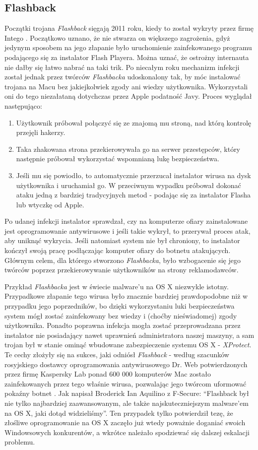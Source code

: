 \documentclass[polish]{kbk}
\begin{document}
\subsection{Flashback \cite{flashback}}
Początki trojana \textit{Flashback} sięgają 2011 roku, kiedy to został wykryty przez firmę Intego \cite{intego}. Początkowo uznano, że nie stwarza on większego zagrożenia, gdyż jedynym sposobem na jego złapanie było uruchomienie zainfekowanego programu podającego się za instalator Flash Playera. Można uznać, że ostrożny internauta nie dałby się łatwo nabrać na taki trik. Po niecałym roku mechanizm infekcji został jednak przez twórców \textit{Flashbacka} udoskonalony tak, by móc instalować trojana na Macu bez jakiejkolwiek zgody ani wiedzy użytkownika. Wykorzystali oni do tego niezałataną dotychczas przez Apple podatność Javy. Proces wyglądał następująco:
\begin{enumerate}
\item Użytkownik próbował połączyć się ze znajomą mu stroną, nad którą kontrolę przejęli hakerzy.
\item Taka zhakowana strona przekierowywała go na serwer przestępców, który następnie próbował wykorzystać wspomnianą lukę bezpieczeństwa.
\item Jeśli mu się powiodło, to automatycznie przerzucał instalator wirusa na dysk użytkownika i uruchamiał go. W przeciwnym wypadku próbował dokonać ataku jedną z bardziej tradycyjnych metod - podając się za instalator Flasha lub wtyczkę od Apple.
\end{enumerate}
Po udanej infekcji instalator sprawdzał, czy na komputerze ofiary zainstalowane jest oprogramowanie antywirusowe i jeśli takie wykrył, to przerywał proces atak, aby uniknąć wykrycia. Jeśli natomiast system nie był chroniony, to instalator kończył swoją pracę podłączając komputer ofiary do botnetu atakujących. Głównym celem, dla którego stworzono \textit{Flashbacka}, było wzbogacenie się jego twórców poprzez przekierowywanie użytkowników na strony reklamodawców.

Przykład \textit{Flashbacka} jest w świecie malware'u na OS X niezwykle istotny. Przypadkowe złapanie tego wirusa było znacznie bardziej prawdopodobne niż w przypadku jego poprzedników, bo dzięki wykorzystaniu luki bezpieczeństwa system mógł zostać zainfekowany bez wiedzy i (choćby nieświadomej) zgody użytkownika. Ponadto poprawna infekcja mogła zostać przeprowadzana przez instalator nie posiadający nawet uprawnień administratora naszej maszyny, a sam trojan był w stanie ominąć wbudowane zabezpieczenie systemu OS X - \textit{XProtect}. Te cechy złożyły się na sukces, jaki odniósł \textit{Flashback} - według szacunków rosyjskiego dostawcy oprogramowania antywirusowego Dr. Web potwierdzonych przez firmę Kaspersky Lab ponad 600 000 komputerów Mac zostało zainfekowanych przez tego właśnie wirusa, pozwalając jego twórcom uformować pokaźny botnet \cite{dr-web, kaspersky}. Jak napisał Broderick Ian Aquilino z F-Secure: ``Flashback był nie tylko najbardziej zaawansowanym, ale także najskuteczniejszym malware'em na OS X, jaki dotąd widzieliśmy''. Ten przypadek tylko potwierdził tezę, że złośliwe oprogramowanie na OS X zaczęło już wtedy poważnie doganiać swoich Windowsowych konkurentów, a wkrótce należało spodziewać się dalszej eskalacji problemu.
\end{document}
